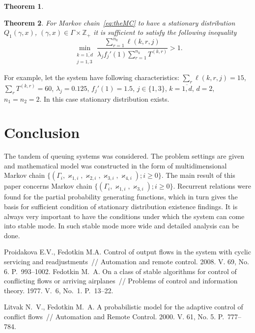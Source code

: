 \documentclass[60x84/16,10pt]{dccn}
\newtheorem{theorem}{Theorem}[section]
\begin{document}
{\begin{theorem}
\label{theorem:gen}
\end{theorem}



\begin{theorem}\sloppy
For Markov chain~\eqref{eq:theMC} to have a stationary distribution $Q_1(\gamma,x)$, $(\gamma,x)\in \Gamma \times {\mathbb Z}_+$ it is sufficient to satisfy the following inequality 
\begin{equation}
\min_{\substack{k=\overline{1,d}\\ j=1,3}} { \frac{\sum_{r = 1}^{n_k} \ell(k,r,j) }{\lambda_j f_j'(1) \sum_{r=1}^{n_k} T^{(k,r)} }}>1.
\label{sufficient:double}
\end{equation}
\end{theorem}
For example, let the system have following characteristics: $\sum_{r} \ell(k,r,j) = 15$, $\sum_{r} T^{(k,r)}=60$, $\lambda_j=0.125$, $f_j'(1)=1.5$, $j\in \{1,3\}$, $k=\overline{1,d}$, $d=2$, $n_1=n_2=2$. In this case stationary distribution exists.

\section{Conclusion}
The tandem of queuing systems was considered. The problem settings are given and mathematical model was constructed in the form of multidimensional Markov chain $\{(\Gamma_i, \varkappa_{1,i}, \varkappa_{2,i}, \varkappa_{3,i}, \varkappa_{4,i}); i \geqslant 0\}$. The main result of this paper concerns Markov chain $\{(\Gamma_i, \varkappa_{1,i}, \varkappa_{3,i}); i \geqslant 0 \}$. Recurrent relations were found for the partial  probability generating functions, which in turn gives the basis for sufficient condition of stationary distribution existence findings. It is always very important to have the conditions under which the system can come into stable mode. In such stable mode more wide and detailed analysis can be done.

\begin{thebibliography}{11}
%
  Proidakova E.V., Fedotkin M.A. Control of output flows in the system with cyclic servicing and
  readjustments~// Automation and remote control. 2008. V. 69, No. 6. P.~993--1002.
Fedotkin M.~A. On a class of stable algorithms for control of conflicting flows or arriving
  airplanes~// Problems of control and information theory. 1977. V.~6, No.~1. P.~13--22.

%
  Litvak N.~V., Fedotkin M.~A. A probabilistic model for the
  adaptive control of conflict flows~// Automation and Remote Control. 2000. V. 61, No. 5. P.~777--784.


\end{thebibliography}}
\end{document}
